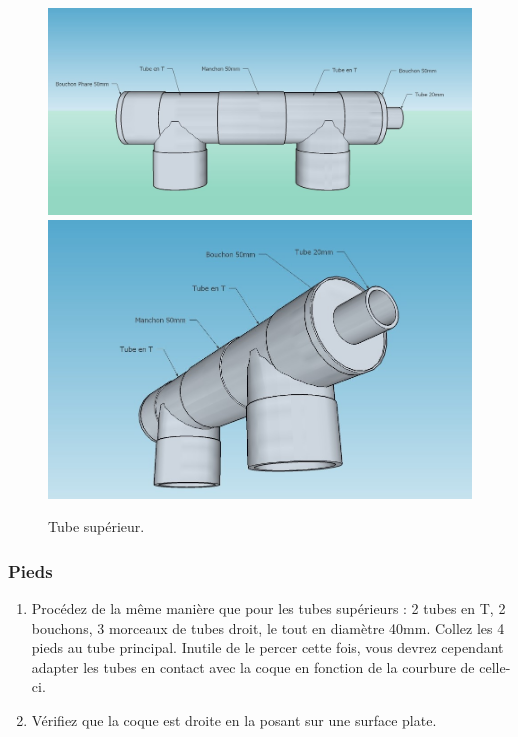 \documentclass[11pt,a4paper]{article}
\begin{document}
          \begin{figure}[H]
            \centering
            \includegraphics[scale=0.3]{ROVTubeSuperieur.jpg}
            \includegraphics[scale=0.24]{ROVTubeSuperieurArriere.jpg}
            \caption{Tube supérieur.}
          \end{figure}
          
        \subsubsection{Pieds}
          \begin{enumerate}
            \item Procédez de la même manière que pour les tubes supérieurs : 2 tubes en T, 2 bouchons, 3 morceaux de tubes droit, le tout en diamètre 40mm. Collez les 4 pieds au tube principal. Inutile de le percer cette fois, vous devrez cependant adapter les tubes en contact avec la coque en fonction de la courbure de celle-ci.
            
            \item Vérifiez que la coque est droite en la posant sur une surface plate.
        \end{enumerate}
        
\end{document}
